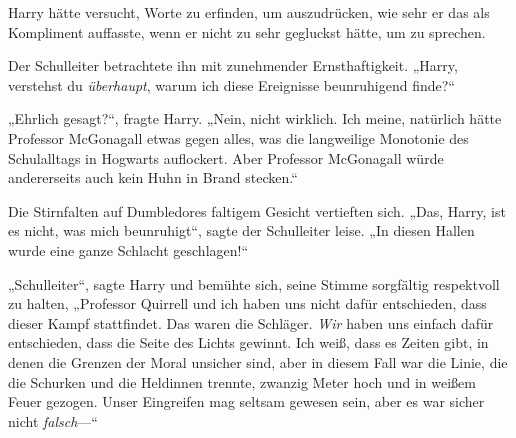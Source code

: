 Harry hätte versucht, Worte zu erfinden, um auszudrücken, wie sehr er das als Kompliment auffasste, wenn er nicht zu sehr gegluckst hätte, um zu sprechen.

Der Schulleiter betrachtete ihn mit zunehmender Ernsthaftigkeit.
„Harry, verstehst du \emph{überhaupt}, warum ich diese Ereignisse beunruhigend finde?“

„Ehrlich gesagt?“, fragte Harry.
„Nein, nicht wirklich. Ich meine, natürlich hätte Professor McGonagall etwas gegen alles, was die langweilige Monotonie des Schulalltags in Hogwarts auflockert. Aber Professor McGonagall würde andererseits auch kein Huhn in Brand stecken.“

Die Stirnfalten auf Dumbledores faltigem Gesicht vertieften sich.
„Das, Harry, ist es nicht, was mich beunruhigt“, sagte der Schulleiter leise.
„In diesen Hallen wurde eine ganze Schlacht geschlagen!“

„Schulleiter“, sagte Harry und bemühte sich, seine Stimme sorgfältig respektvoll zu halten,
„Professor Quirrell und ich haben uns nicht dafür entschieden, dass dieser Kampf stattfindet. Das waren die Schläger. \emph{Wir} haben uns einfach dafür entschieden, dass die Seite des Lichts gewinnt. Ich weiß, dass es Zeiten gibt, in denen die Grenzen der Moral unsicher sind, aber in diesem Fall war die Linie, die die Schurken und die Heldinnen trennte, zwanzig Meter hoch und in weißem Feuer gezogen. Unser Eingreifen mag seltsam gewesen sein, aber es war sicher nicht \emph{falsch}—“

